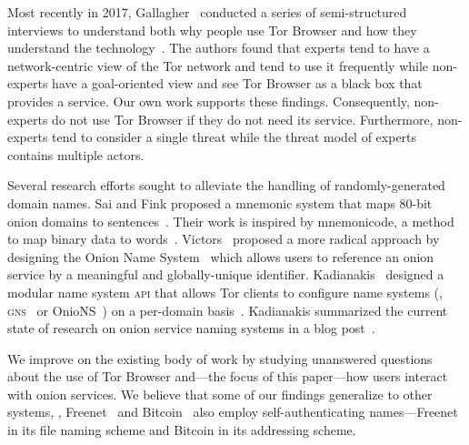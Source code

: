 Most recently in 2017, Gallagher \ea\ conducted a series of semi-structured
interviews to understand both why people use Tor Browser and how they understand
the technology~\cite{Gallagher2017a}.  The authors found that experts tend to
have a network-centric view of the Tor network and tend to use it frequently
while non-experts have a goal-oriented view and see Tor Browser as a black box
that provides a service.  Our own work supports these findings.  Consequently,
non-experts do not use Tor Browser if they do not need its service.
Furthermore, non-experts tend to consider a single threat while the threat model
of experts contains multiple actors.

Several research efforts sought to alleviate the handling of randomly-generated
domain names.  Sai and Fink proposed a mnemonic system that maps 80-bit onion
domains to sentences~\cite{Sai2012a}.  Their work is inspired by mnemonicode, a
method to map binary data to words~\cite{mnemonicode}.  Victors \ea\ proposed a
more radical approach by designing the Onion Name System~\cite{Victors2017a}
which allows users to reference an onion service by a meaningful and
globally-unique identifier.  Kadianakis \ea\ designed a modular name system
\textsc{api} that allows Tor clients to configure name systems (\eg,
\textsc{gns}~\cite{Schanzenbach2012a} or OnioNS~\cite{Victors2017a}) on a
per-domain basis~\cite{Kadianakis2016a}.  Kadianakis summarized the current
state of research on onion service naming systems in a blog
post~\cite{Kadianakis2017a}.

We improve on the existing body of work by studying unanswered questions about
the use of Tor Browser and---the focus of this paper---how users interact with
onion services.  We believe that some of our findings generalize to other
systems, \eg, Freenet~\cite{Freenet} and Bitcoin~\cite{Nakamoto2008a} also
employ self-authenticating names---Freenet in its file naming scheme and Bitcoin
in its addressing scheme.
